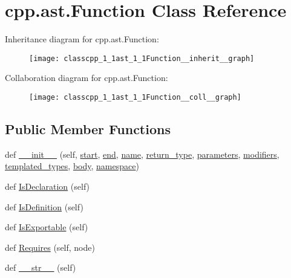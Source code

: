 \hypertarget{classcpp_1_1ast_1_1Function}{}\section{cpp.\+ast.\+Function Class Reference}
\label{classcpp_1_1ast_1_1Function}


Inheritance diagram for cpp.\+ast.\+Function\+:\nopagebreak
\begin{figure}[H]
\begin{center}
\leavevmode
\texttt{[image: classcpp\_1\_1ast\_1\_1Function\_\_inherit\_\_graph]}
\end{center}
\end{figure}


Collaboration diagram for cpp.\+ast.\+Function\+:\nopagebreak
\begin{figure}[H]
\begin{center}
\leavevmode
\texttt{[image: classcpp\_1\_1ast\_1\_1Function\_\_coll\_\_graph]}
\end{center}
\end{figure}
\subsection*{Public Member Functions}
\begin{DoxyCompactItemize}
\item 
def \hyperlink{classcpp_1_1ast_1_1Function_ab5270f5d353ec5e9dcd136e4cc6c7f6c}{\+\_\+\+\_\+init\+\_\+\+\_\+} (self, \hyperlink{classcpp_1_1ast_1_1Node_a7b2aa97e6a049bb1a93aea48c48f1f44}{start}, \hyperlink{classcpp_1_1ast_1_1Node_a3c5e5246ccf619df28eca02e29d69647}{end}, \hyperlink{classcpp_1_1ast_1_1__GenericDeclaration_af774f4729dfd78d0538a6782fe8514c1}{name}, \hyperlink{classcpp_1_1ast_1_1Function_af750fd788d7ab33163ee066534780212}{return\+\_\+type}, \hyperlink{classcpp_1_1ast_1_1Function_a0e61ef47af9cf2fd4402dbd8cab631ef}{parameters}, \hyperlink{classcpp_1_1ast_1_1Function_ad30eed435f1ff9ff34ade9cc0d7be121}{modifiers}, \hyperlink{classcpp_1_1ast_1_1Function_a57bb03218bade3240137a0d91c467cb6}{templated\+\_\+types}, \hyperlink{classcpp_1_1ast_1_1Function_a8e25e5016b23b38e32acf2df529c0650}{body}, \hyperlink{classcpp_1_1ast_1_1__GenericDeclaration_a8aee3f11b37449d54b42a78e0a689f46}{namespace})
\item 
def \hyperlink{classcpp_1_1ast_1_1Function_ab9120d9a774eb5860d220b3bcdcaa87e}{Is\+Declaration} (self)
\item 
def \hyperlink{classcpp_1_1ast_1_1Function_ad5d96144bd8418ac72332bffb21ea86f}{Is\+Definition} (self)
\item 
def \hyperlink{classcpp_1_1ast_1_1Function_a85a073cd69116bc6191f379d69d10d72}{Is\+Exportable} (self)
\item 
def \hyperlink{classcpp_1_1ast_1_1Function_a999e7b5e43517cd4d68b1aeea8a7d6e1}{Requires} (self, node)
\item 
def \hyperlink{classcpp_1_1ast_1_1Function_aaef91d6a3b1eb2703eebb32d39c45978}{\+\_\+\+\_\+str\+\_\+\+\_\+} (self)
\end{DoxyCompactItemize}
